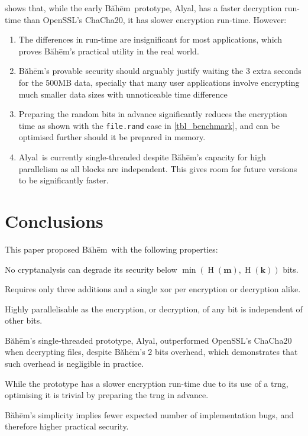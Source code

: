 \documentclass[twocolumn,hidelinks]{article}
\newcommand{\baheem}{Băhēm}
\newcommand{\alyal}{Alyal}
\DeclareMathOperator{\entropy}{H}
\begin{document}
 shows that, while the early \baheem\ prototype,
\alyal, has a faster decryption run-time than OpenSSL's ChaCha20, it has
slower encryption run-time. However:
\begin{enumerate}
    \item The differences in run-time are insignificant for most
        applications, which proves \baheem's practical utility in the real
        world.
    \item \baheem's provable security should arguably justify waiting the
        $3$ extra seconds for the 500MB data, specially that many user
        applications involve encrypting much smaller data sizes with
        unnoticeable time difference
    \item Preparing the random bits in advance significantly reduces the
        encryption time as shown with the \texttt{file.rand} case in
        \cref{tbl_benchmark}, and can be optimised further should it be
        prepared in memory.
    \item \alyal\ is currently single-threaded despite \baheem's capacity
        for high parallelism as all blocks are independent. This gives room
        for future versions to be significantly faster.
\end{enumerate}

\section{Conclusions}
This paper proposed \baheem\ with the following properties:
\begin{description}[itemsep=0em]
    \item[Secure.] No cryptanalysis can degrade its
        security below $\min(\entropy(\mathbf{m}), \entropy(\mathbf{k}))$
        bits.

    \item[Fast.] Requires only three additions and a single \gls{xor} per
        encryption or decryption alike.

        Highly parallelisable as the encryption, or decryption, of any bit
        is independent of other bits.

        \baheem's single-threaded prototype, \alyal, outperformed OpenSSL's
        ChaCha20 when decrypting files, despite \baheem's $2$ bits
        overhead, which demonstrates that such overhead is negligible in
        practice.

        While the prototype has a slower encryption run-time due to its use
        of a \gls{trng}, optimising it is trivial by preparing the
        \gls{trng} in advance.

    \item[Simple.] \baheem's simplicity implies fewer expected number of
        implementation bugs, and therefore higher practical security.
\end{description}



\end{document}
